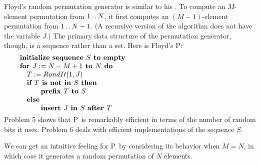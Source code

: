 Floyd's random permutation generator is similar to his . To compute an
$M$-element permutation from $1\mathinner{\ldotp\ldotp} N$, it first computes an $(M-1)$-element
permutation from $1\mathinner{\ldotp\ldotp} N-1.$ (A recursive version of the algorithm does not
have the variable $J.$) The primary data structure of the permutation generator,
though, is a sequence rather than a set. Here is Floyd's \Alg P:
$$\vbox{\let\par=\endgraf
\obeylines\sfcode`;=3000
{\bf initialize sequence $S$ to empty}
{\bf for $J:=N-M+1$ to $N$ do}
\quad $T:=RandIt(1,J)$
\quad {\bf if $T$ is not in $S$ then}
\qquad\quad {\bf prefix $T$ to $S$}
\quad {\bf else}
\qquad\quad {\bf insert $J$ in $S$ after $T$}
}$$
Problem 5 shows that \Alg P\ is remarkably efficient in terms of the number of
random bits it uses. Problem 6 deals with efficient implementations of the
sequence $S.$

We can get an intuitive feeling for \Alg P\ by considering its behavior when
$M=N$, in which case it generates a random permutation of $N$ elements.
\bye
